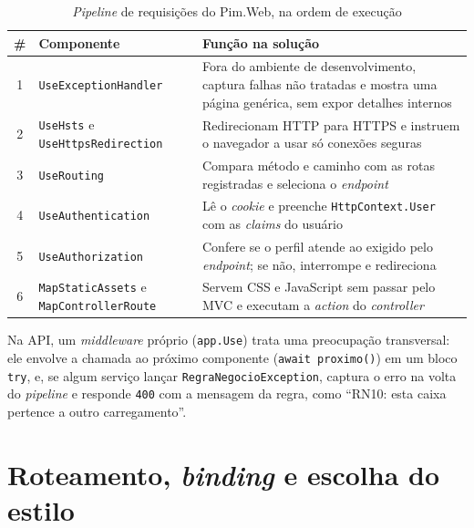 \begin{table}[htbp]
\centering
\caption{\textit{Pipeline} de requisições do Pim.Web, na ordem de execução}
\label{tab:pipeline}
\footnotesize
\begin{tabular}{|c|p{4.4cm}|p{9.2cm}|}
\hline
\textbf{\#} & \textbf{Componente} & \textbf{Função na solução} \\ \hline
1 & \texttt{UseExceptionHandler} & Fora do ambiente de desenvolvimento, captura falhas não tratadas e mostra uma página genérica, sem expor detalhes internos \\ \hline
2 & \texttt{UseHsts} e \texttt{UseHttpsRedirection} & Redirecionam HTTP para HTTPS e instruem o navegador a usar só conexões seguras \\ \hline
3 & \texttt{UseRouting} & Compara método e caminho com as rotas registradas e seleciona o \textit{endpoint} \\ \hline
4 & \texttt{UseAuthentication} & Lê o \textit{cookie} e preenche \texttt{HttpContext.User} com as \textit{claims} do usuário \\ \hline
5 & \texttt{UseAuthorization} & Confere se o perfil atende ao exigido pelo \textit{endpoint}; se não, interrompe e redireciona \\ \hline
6 & \texttt{MapStaticAssets} e \texttt{MapControllerRoute} & Servem CSS e JavaScript sem passar pelo MVC e executam a \textit{action} do \textit{controller} \\ \hline
\end{tabular}
\end{table}

Na API, um \textit{middleware} próprio (\texttt{app.Use}) trata uma preocupação transversal: ele envolve a chamada ao próximo componente (\texttt{await proximo()}) em um bloco \texttt{try}, e, se algum serviço lançar \texttt{RegraNegocioException}, captura o erro na volta do \textit{pipeline} e responde \texttt{400} com a mensagem da regra, como ``RN10: esta caixa pertence a outro carregamento''.


\section{Roteamento, \textit{binding} e escolha do estilo}

